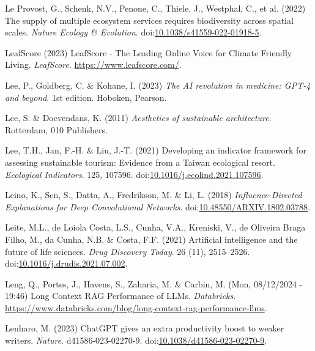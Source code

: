 \documentclass[
  letterpaper,
  DIV=11,
  numbers=noendperiod]{scrartcl}
\newlength{\cslhangindent}
\newenvironment{CSLReferences}[2] %
 {\begin{list}{}{%
  \setlength{\itemindent}{0pt}
  \setlength{\leftmargin}{0pt}
  \setlength{\parsep}{0pt}
  \ifodd #1
   \setlength{\leftmargin}{\cslhangindent}
   \setlength{\itemindent}{-1\cslhangindent}
  \fi
  \setlength{\itemsep}{#2\baselineskip}}}
 {\end{list}}
\begin{document}
\begin{CSLReferences}{0}{1}
Le Provost, G., Schenk, N.V., Penone, C., Thiele, J., Westphal, C., et
al. (2022) The supply of multiple ecosystem services requires
biodiversity across spatial scales. \emph{Nature Ecology \& Evolution}.
doi:\href{https://doi.org/10.1038/s41559-022-01918-5}{10.1038/s41559-022-01918-5}.

LeafScore (2023) {LeafScore} - {The Leading Online Voice} for {Climate
Friendly Living}. \emph{LeafScore}. \url{https://www.leafscore.com/}.

Lee, P., Goldberg, C. \& Kohane, I. (2023) \emph{The {AI} revolution in
medicine: {GPT-4} and beyond}. 1st edition. Hoboken, Pearson.

Lee, S. \& Doevendans, K. (2011) \emph{Aesthetics of sustainable
architecture}. Rotterdam, 010 Publishers.

Lee, T.H., Jan, F.-H. \& Liu, J.-T. (2021) Developing an indicator
framework for assessing sustainable tourism: {Evidence} from a {Taiwan}
ecological resort. \emph{Ecological Indicators}. 125, 107596.
doi:\href{https://doi.org/10.1016/j.ecolind.2021.107596}{10.1016/j.ecolind.2021.107596}.

Leino, K., Sen, S., Datta, A., Fredrikson, M. \& Li, L. (2018)
\emph{Influence-{Directed Explanations} for {Deep Convolutional
Networks}}.
doi:\href{https://doi.org/10.48550/ARXIV.1802.03788}{10.48550/ARXIV.1802.03788}.

Leite, M.L., de Loiola Costa, L.S., Cunha, V.A., Kreniski, V., de
Oliveira Braga Filho, M., da Cunha, N.B. \& Costa, F.F. (2021)
Artificial intelligence and the future of life sciences. \emph{Drug
Discovery Today}. 26 (11), 2515--2526.
doi:\href{https://doi.org/10.1016/j.drudis.2021.07.002}{10.1016/j.drudis.2021.07.002}.

Leng, Q., Portes, J., Havens, S., Zaharia, M. \& Carbin, M. (Mon,
08/12/2024 - 19:46) Long {Context RAG Performance} of {LLMs}.
\emph{Databricks}.
\url{https://www.databricks.com/blog/long-context-rag-performance-llms}.

Lenharo, M. (2023) {ChatGPT} gives an extra productivity boost to weaker
writers. \emph{Nature}. d41586-023-02270-9.
doi:\href{https://doi.org/10.1038/d41586-023-02270-9}{10.1038/d41586-023-02270-9}.


\end{CSLReferences}
\end{document}
